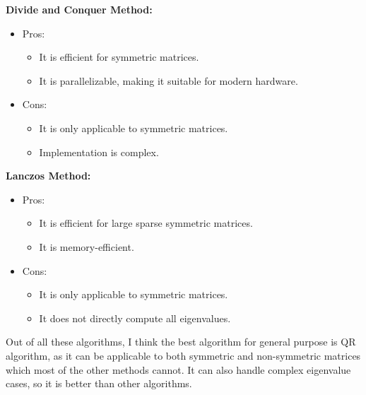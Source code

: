 \documentclass[a4paper, 14pt]{article}
\begin{document}
\textbf{Divide and Conquer Method:}
\begin{itemize}
    \item Pros:
    \begin{itemize}
        \item It is efficient for symmetric matrices.
        \item It is parallelizable, making it suitable for modern hardware.
    \end{itemize}
    \item Cons:
    \begin{itemize}
        \item It is only applicable to symmetric matrices.
        \item Implementation is complex.
    \end{itemize}
\end{itemize}
\textbf{Lanczos Method:}
\begin{itemize}
    \item Pros:
    \begin{itemize}
        \item It is efficient for large sparse symmetric matrices.
        \item It is memory-efficient.
    \end{itemize}
    \item Cons:
    \begin{itemize}
        \item It is only applicable to symmetric matrices.
        \item It does not directly compute all eigenvalues.\\
    \end{itemize}
\end{itemize}
Out of all these algorithms, I think the best algorithm for general purpose is QR algorithm, as it can be applicable to both symmetric and non-symmetric matrices which most of the other methods cannot. It can also handle complex eigenvalue cases, so it is better than other algorithms.
\pagebreak
\end{document}

